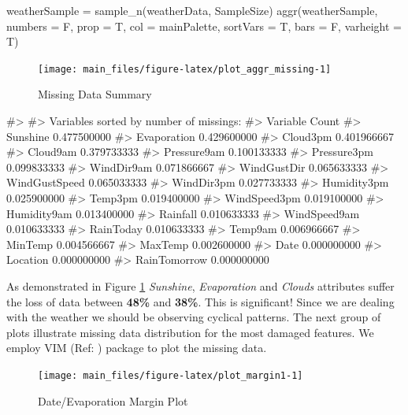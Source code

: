 \begin{Schunk}
\begin{Sinput}
weatherSample = sample_n(weatherData, SampleSize)
aggr(weatherSample, numbers = F, prop = T, col = mainPalette, sortVars = T, bars = F, varheight = T)
\end{Sinput}
\begin{figure}[H]

{\centering \texttt{[image: main\_files/figure-latex/plot\_aggr\_missing-1]} 

}

\caption[Missing Data Summary]{Missing Data Summary}\label{fig:plot_aggr_missing}
\end{figure}
\begin{Soutput}
#> 
#>  Variables sorted by number of missings: 
#>       Variable       Count
#>       Sunshine 0.477500000
#>    Evaporation 0.429600000
#>       Cloud3pm 0.401966667
#>       Cloud9am 0.379733333
#>    Pressure9am 0.100133333
#>    Pressure3pm 0.099833333
#>     WindDir9am 0.071866667
#>    WindGustDir 0.065633333
#>  WindGustSpeed 0.065033333
#>     WindDir3pm 0.027733333
#>    Humidity3pm 0.025900000
#>        Temp3pm 0.019400000
#>   WindSpeed3pm 0.019100000
#>    Humidity9am 0.013400000
#>       Rainfall 0.010633333
#>   WindSpeed9am 0.010633333
#>      RainToday 0.010633333
#>        Temp9am 0.006966667
#>        MinTemp 0.004566667
#>        MaxTemp 0.002600000
#>           Date 0.000000000
#>       Location 0.000000000
#>   RainTomorrow 0.000000000
\end{Soutput}
\end{Schunk}

As demonstrated in Figure \ref{fig:plot_aggr_missing} \emph{Sunshine},
\emph{Evaporation} and \emph{Clouds} attributes suffer the loss of data
between \textbf{48\%} and \textbf{38\%}. This is significant! Since we
are dealing with the weather we should be observing cyclical patterns.
The next group of plots illustrate missing data distribution for the
most damaged features. We employ VIM (Ref: \cite{vim}) package to plot
the missing data.

\begin{Schunk}
\begin{figure}[H]

{\centering \texttt{[image: main\_files/figure-latex/plot\_margin1-1]} 

}

\caption[Date/Evaporation Margin Plot]{Date/Evaporation Margin Plot}\label{fig:plot_margin1}
\end{figure}
\end{Schunk}

